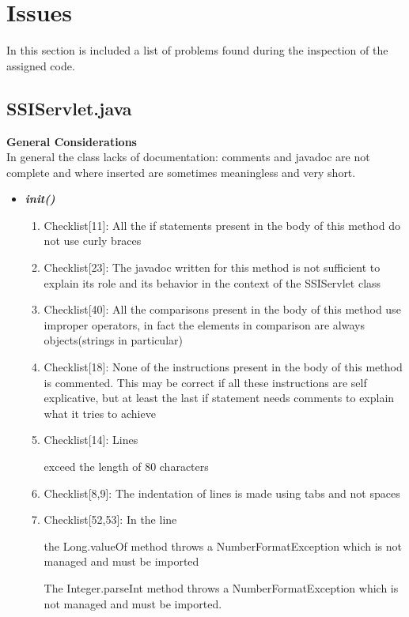 \documentclass[11pt,titlepage]{article} %
\begin{document}
\section{Issues}
In this section is included a list of problems found during the inspection of the assigned code.
\subsection{SSIServlet.java}
  \textbf{General Considerations} \hfill \\
  In general the class lacks of documentation: comments and javadoc are not complete and where inserted are sometimes meaningless and very short.
  \begin{itemize}
   \item \textbf{\textit{init()}}
   \begin{enumerate}
    \item Checklist[11]: All the if statements present in the body of this method do not use curly braces
    \item Checklist[23]: The javadoc written for this method is not sufficient to explain its role and its behavior in the context of the SSIServlet class
    \item Checklist[40]: All the comparisons present in the body of this method use improper operators, in fact the elements in comparison are always objects(strings in particular)
    \item Checklist[18]: None of the instructions present in the body of this method is commented. This may be correct if all these instructions are self explicative, but at least the last if statement needs comments to explain what it tries to achieve
    \item Checklist[14]: Lines
      
      
      
      
      
      exceed the length of 80 characters
    \item Checklist[8,9]: The indentation of lines is made using tabs and not spaces
    \item Checklist[52,53]: In the line
      
      the Long.valueOf method throws a NumberFormatException which is not managed and must be imported
      
      The Integer.parseInt method throws a NumberFormatException which is not managed and must be imported.
   \end{enumerate}


\end{itemize}
\end{document}
